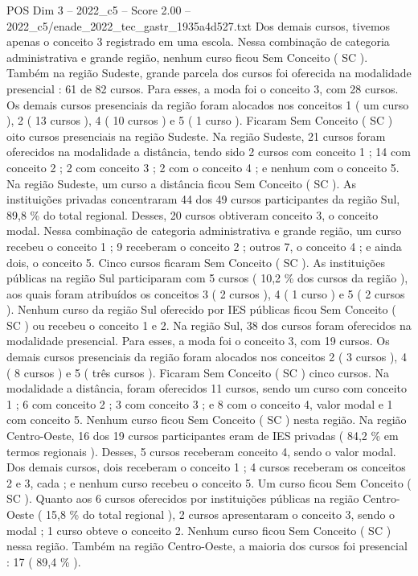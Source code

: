 \begin{textsample}{POS Dim 3 – 2022\_c5 – Score 2.00 – 2022\_c5/enade\_2022\_tec\_gastr\_1935a4d527.txt}
Dos demais cursos, tivemos apenas o conceito 3 registrado em uma escola.
Nessa combinação de categoria administrativa e grande região, nenhum curso ficou Sem Conceito ( SC ).
Também na região Sudeste, grande parcela dos cursos foi oferecida na modalidade presencial : 61 de 82 cursos.
Para esses, a moda foi o conceito 3, com 28 cursos.
Os demais cursos presenciais da região foram alocados nos conceitos 1 ( um curso ), 2 ( 13 cursos ), 4 ( 10 cursos ) e 5 ( 1 curso ).
Ficaram Sem Conceito ( SC ) oito cursos presenciais na região Sudeste.
Na região Sudeste, 21 cursos foram oferecidos na modalidade a distância, tendo sido 2 cursos com conceito 1 ; 14 com conceito 2 ; 2 com conceito 3 ; 2 com o conceito 4 ; e nenhum com o conceito 5.
Na região Sudeste, um curso a distância ficou Sem Conceito ( SC ).
As instituições privadas concentraram 44 dos 49 cursos participantes da região Sul, 89,8 \% do total regional.
Desses, 20 cursos obtiveram conceito 3, o conceito modal.
Nessa combinação de categoria administrativa e grande região, um curso recebeu o conceito 1 ; 9 receberam o conceito 2 ; outros 7, o conceito 4 ; e ainda dois, o conceito 5.
Cinco cursos ficaram Sem Conceito ( SC ).
As instituições públicas na região Sul participaram com 5 cursos ( 10,2 \% dos cursos da região ), aos quais foram atribuídos os conceitos 3 ( 2 cursos ), 4 ( 1 curso ) e 5 ( 2 cursos ).
Nenhum curso da região Sul oferecido por IES públicas ficou Sem Conceito ( SC ) ou recebeu o conceito 1 e 2.
Na região Sul, 38 dos cursos foram oferecidos na modalidade presencial.
Para esses, a moda foi o conceito 3, com 19 cursos.
Os demais cursos presenciais da região foram alocados nos conceitos 2 ( 3 cursos ), 4 ( 8 cursos ) e 5 ( três cursos ).
Ficaram Sem Conceito ( SC ) cinco cursos.
Na modalidade a distância, foram oferecidos 11 cursos, sendo um curso com conceito 1 ; 6 com conceito 2 ; 3 com conceito 3 ; e 8 com o conceito 4, valor modal e 1 com conceito 5.
Nenhum curso ficou Sem Conceito ( SC ) nesta região.
Na região Centro-Oeste, 16 dos 19 cursos participantes eram de IES privadas ( 84,2 \% em termos regionais ).
Desses, 5 cursos receberam conceito 4, sendo o valor modal.
Dos demais cursos, dois receberam o conceito 1 ; 4 cursos receberam os conceitos 2 e 3, cada ; e nenhum curso recebeu o conceito 5.
Um curso ficou Sem Conceito ( SC ).
Quanto aos 6 cursos oferecidos por instituições públicas na região Centro-Oeste ( 15,8 \% do total regional ), 2 cursos apresentaram o conceito 3, sendo o modal ; 1 curso obteve o conceito 2.
Nenhum curso ficou Sem Conceito ( SC ) nessa região.
Também na região Centro-Oeste, a maioria dos cursos foi presencial : 17 ( 89,4 \% ).

\end{textsample}
